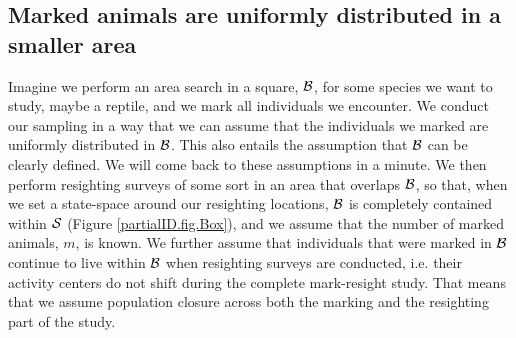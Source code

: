 \subsection{Marked animals are uniformly distributed in a smaller area}
Imagine we perform an area search in a square, ${\cal B}$, for some species we want to study, maybe a reptile, and we mark all individuals we encounter. We conduct our sampling in a way that we can assume that the individuals we marked are uniformly distributed in ${\cal B}$. This also entails the assumption that ${\cal B}$ can be clearly defined. We will come back to these assumptions in a minute. We then perform resighting surveys of some sort in an area that overlaps ${\cal B}$, so that, when we set a state-space around our resighting locations, ${\cal B}$ is completely contained within ${\cal S}$ (Figure \ref{partialID.fig.Box}), and we assume that the number of marked animals, $m$, is known. We further assume that individuals that were marked in ${\cal B}$ continue to live within ${\cal B}$ when resighting surveys are conducted, i.e. their activity centers do not shift during the complete mark-resight study. That means that we assume population closure across both the marking and the resighting part of the study.

